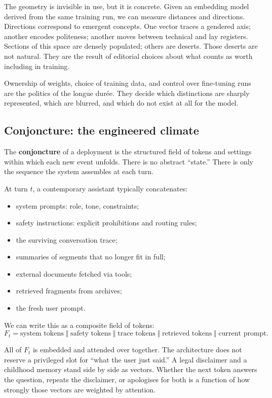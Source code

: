 \documentclass[12pt,a4paper]{article}
\begin{document}
The geometry is invisible in use, but it is concrete. Given an embedding model derived from the same training run, we can measure distances and directions. Directions correspond to emergent concepts. One vector traces a gendered axis; another encodes politeness; another moves between technical and lay registers. Sections of this space are densely populated; others are deserts. Those deserts are not natural. They are the result of editorial choices about what counts as worth including in training.

Ownership of weights, choice of training data, and control over fine-tuning runs are the politics of the longue dur\'ee. They decide which distinctions are sharply represented, which are blurred, and which do not exist at all for the model.

\subsection{Conjoncture: the engineered climate}

The \textbf{conjoncture} of a deployment is the structured field of tokens and settings within which each new event unfolds. There is no abstract ``state.'' There is only the sequence the system assembles at each turn.

At turn $t$, a contemporary assistant typically concatenates:

\begin{itemize}
  \item system prompts: role, tone, constraints;
  \item safety instructions: explicit prohibitions and routing rules;
  \item the surviving conversation trace;
  \item summaries of segments that no longer fit in full;
  \item external documents fetched via tools;
  \item retrieved fragments from archives;
  \item the fresh user prompt.
\end{itemize}

We can write this as a composite field of tokens:
\[
F_t = \text{system tokens} \;\Vert\; \text{safety tokens} \;\Vert\; \text{trace tokens} \;\Vert\; \text{retrieved tokens} \;\Vert\; \text{current prompt}.
\]

All of $F_t$ is embedded and attended over together. The architecture does not reserve a privileged slot for ``what the user just said.'' A legal disclaimer and a childhood memory stand side by side as vectors. Whether the next token answers the question, repeats the disclaimer, or apologises for both is a function of how strongly those vectors are weighted by attention.
\end{document}
